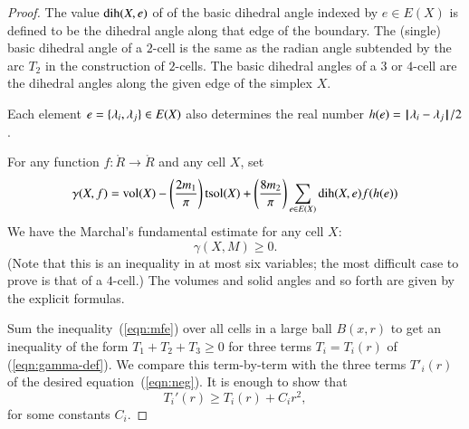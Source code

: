 \begin{proof}
The value
$\operatorname{dih}(X,e)$ of
of the basic dihedral angle indexed by $e\in E(X)$ is defined to be the dihedral angle along that edge
of the boundary.  
The (single) basic  dihedral angle of a $2$-cell is
the same as the radian angle subtended by the arc $T_2$ in the construction of $2$-cells.
The basic dihedral angles of a $3$ or $4$-cell are the dihedral angles along the given edge of the simplex $X$. 

Each element $e=\{\lambda_i,\lambda_j\}\in E(X)$ also determines
the real number $h(e) = {\hskip0.1em|\hskip-0.15em|\hskip0.1em}\lambda_i - \lambda_j{\hskip0.1em|\hskip-0.15em|\hskip0.1em}/2$.

For any function $f:\ring{R}\to\ring{R}$ and any cell $X$, set
\begin{equation}\label{eqn:gamma-def}
\gamma(X,f) =  {\operatorname{vol}}(X)
-\left(\frac{2m_1}{\pi}\right) {\operatorname{tsol}}(X) + \left(\frac{8m_2}{\pi}\right)
\sum_{e\in E(X)} \operatorname{dih}(X,e)  f(h(e))
\end{equation}
We have the Marchal's fundamental estimate\cite[cc:mar]{hales:2009:nonlinear} for any cell $X$:  %
\begin{equation}\label{eqn:mfe}
\gamma(X,M)\ge 0.
\end{equation}
(Note that this is an inequality in at most six variables; the most difficult case to prove is that of a $4$-cell.)  The volumes and solid angles and so forth are given by the explicit formulas.

Sum the inequality~(\ref{eqn:mfe}) over all cells in a large ball $B(x,r)$ to get an
inequality of the form $T_1 + T_2 + T_3\ge 0$ for three terms $T_i = T_i(r)$ of (\ref{eqn:gamma-def}).  We compare this term-by-term
with the three terms $T'_i(r)$ of the desired equation~(\ref{eqn:neg}). 
It is enough to show that
$$
T_i'(r) \ge T_i(r) + C_i r^2,
$$
for some constants $C_i$.


\end{proof}
